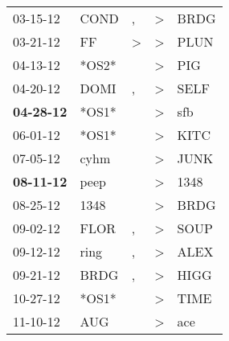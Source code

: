 \begin{supertabular}{p{0.07\textwidth}p{0.06\textwidth}p{0.02\textwidth}p{0.02\textwidth}p{0.06\textwidth}}
          03-15-12\textsuperscript{} &           COND\textsuperscript{} &                , &     \textgreater &           BRDG\textsuperscript{} \\
          03-21-12\textsuperscript{} &             FF\textsuperscript{} &     \textgreater &     \textgreater &           PLUN\textsuperscript{} \\
          04-13-12\textsuperscript{} &                            *OS2* &                  &     \textgreater &            PIG\textsuperscript{} \\
          04-20-12\textsuperscript{} &           DOMI\textsuperscript{} &                , &     \textgreater &           SELF\textsuperscript{} \\
 \textbf{04-28-12\textsuperscript{}} &                            *OS1* &                  &     \textgreater &            sfb\textsuperscript{} \\
          06-01-12\textsuperscript{} &                            *OS1* &                  &     \textgreater &           KITC\textsuperscript{} \\
          07-05-12\textsuperscript{} &           cyhm\textsuperscript{} &                  &     \textgreater &           JUNK\textsuperscript{} \\
 \textbf{08-11-12\textsuperscript{}} &           peep\textsuperscript{} &                  &     \textgreater &           1348\textsuperscript{} \\
          08-25-12\textsuperscript{} &           1348\textsuperscript{} &                  &     \textgreater &           BRDG\textsuperscript{} \\
          09-02-12\textsuperscript{} &           FLOR\textsuperscript{} &                , &     \textgreater &           SOUP\textsuperscript{} \\
          09-12-12\textsuperscript{} &           ring\textsuperscript{} &                , &     \textgreater &           ALEX\textsuperscript{} \\
          09-21-12\textsuperscript{} &           BRDG\textsuperscript{} &                , &     \textgreater &           HIGG\textsuperscript{} \\
          10-27-12\textsuperscript{} &                            *OS1* &                  &     \textgreater &           TIME\textsuperscript{} \\
          11-10-12\textsuperscript{} &            AUG\textsuperscript{} &                  &     \textgreater &            ace\textsuperscript{} \\

\end{supertabular}
